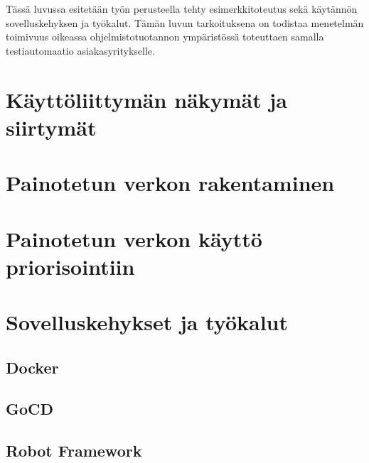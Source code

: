 Tässä luvussa esitetään työn perusteella tehty esimerkkitoteutus sekä käytännön sovelluskehyksen ja työkalut.
Tämän luvun tarkoituksena on todistaa menetelmän toimivuus oikeassa ohjelmistotuotannon ympäristössä toteuttaen samalla testiautomaatio asiakasyritykselle.

\section{Käyttöliittymän näkymät ja siirtymät} \label{ch:11_kayttoliittyman_nakymat_ja_siirtymat}


\section{Painotetun verkon rakentaminen} \label{ch:11_painotetun_verkon_rakentaminen}


\section{Painotetun verkon käyttö priorisointiin} \label{ch:11_painotetun_verkon_kaytto_priorisointiin}


\section{Sovelluskehykset ja työkalut} \label{ch:11_sovelluskehykset_ja_tyokalut}


  \subsection{Docker} \label{ch:11_docker}


  \subsection{GoCD} \label{ch:11_gocd}


  \subsection{Robot Framework} \label{ch:11_robot_framework}


